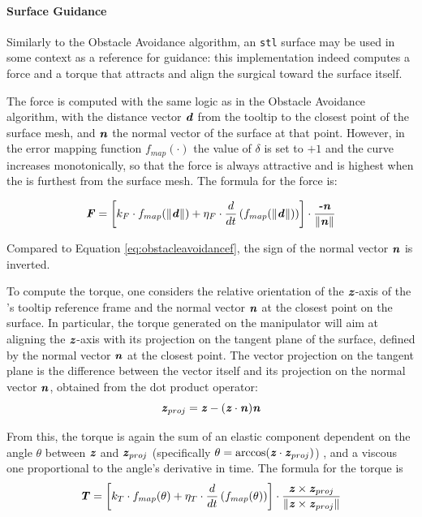 \documentclass[../main.tex]{subfiles}
\begin{document}
\paragraph{Surface Guidance} Similarly to the Obstacle Avoidance algorithm, an \texttt{stl} surface may be used in some context as a reference for guidance: this implementation indeed computes a force and a torque that attracts and align the surgical \ee toward the surface itself. 

The force is computed with the same logic as in the Obstacle Avoidance algorithm, with the distance vector $\textbf{\textit{d}}$ from the \psm tooltip to the closest point of the surface mesh, and $\textbf{\textit{n}}$ the normal vector of the surface at that point. However, in the error mapping function $f_{map}(\cdot)$ the value of $\delta$ is set to $+1$ and the curve increases monotonically, so that the force is always attractive and is highest when the \psm is furthest from the surface mesh. The formula for the force is:

\begin{equation}
    \textbf{\textit{F}} = \left[k_F\cdot f_{map}(\|\textbf{\textit{d}}\|) + \eta_F\cdot \frac{d}{dt} \left( f_{map}(\|\textbf{\textit{d}}\|)\right)\right]\cdot \frac{\textbf{\textit{-n}}}{\|\textbf{\textit{n}}\|} 
\end{equation}

Compared to Equation \ref{eq:obstacleavoidancef}, the sign of the normal vector $\textbf{\textit{n}}$ is inverted.

To compute the torque, one considers the relative orientation of the $\textbf{\textit{z}}$-axis of the \psm's tooltip reference frame and the normal vector $\textbf{\textit{n}}$ at the closest point on the surface. In particular, the torque generated on the manipulator will aim at aligning the $\textbf{\textit{z}}$-axis with its projection on the tangent plane of the surface, defined by the normal vector $\textbf{\textit{n}}$ at the closest point. The vector projection on the tangent plane is the difference between the vector itself and its projection on the normal vector $\textbf{\textit{n}}$, obtained from the dot product operator:
\begin{equation}
    \textbf{\textit{z}}_{proj} = \textbf{\textit{z}} - (\textbf{\textit{z}}\cdot\textbf{\textit{n}})\textbf{\textit{n}}
\end{equation} 

From this, the torque is again the sum of an elastic component dependent on the angle $\theta$ between $\textbf{\textit{z}}$ and $\textbf{\textit{z}}_{proj}$ (specifically $\theta = \arccos(\textbf{\textit{z}}\cdot\textbf{\textit{z}}_{proj})$) , and a viscous one proportional to the angle's derivative in time. The formula for the torque is
\begin{equation}
    \textbf{\textit{T}} = \left[k_T\cdot f_{map}(\theta) + \eta_T\cdot \frac{d}{dt} \left( f_{map}(\theta)\right)\right]\cdot \frac{\textbf{\textit{z}} \times \textbf{\textit{z}}_{proj}}{\|\textbf{\textit{z}} \times \textbf{\textit{z}}_{proj}\|}
    \label{eq:}
\end{equation}
\end{document}
